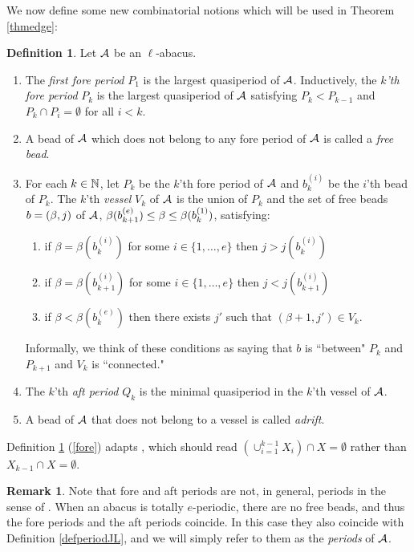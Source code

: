 \documentclass[12pt]{amsart}
\numberwithin{equation}{section}
\theoremstyle{definition}
\newtheorem{definition}[equation]{Definition}
\newtheorem{remark}[equation]{Remark}
\newcommand{\emp}{\emptyset}
\begin{document}
We now define some new combinatorial notions which will be used in Theorem \ref{thmedge}:
\begin{definition}\label{defperiods} Let $\mathcal{A}$ be an $\ell$-abacus.
\begin{enumerate}
 \item\label{fore} The \textit{first fore period} $P_1$ is the largest quasiperiod of $\mathcal{A}$. Inductively, the \textit{$k$'th fore period} $P_k$ is the largest quasiperiod of $\mathcal{A}$ satisfying $P_k<P_{k-1}$ and $P_k\cap P_i=\emp$ for all $i<k$.
\item A bead of $\mathcal{A}$ which does not belong to any fore period of $\mathcal{A}$ is called a \textit{free bead}.
\item\label{vessel} 
For each $k\in\mathbb{N}$, let $P_k$ be the $k$'th fore period of $\mathcal{A}$ and $b_k^{(i)}$ be the $i$'th bead of $P_k$.
The $k$'th \textit{vessel} $V_k$ of $\mathcal{A}$ is the union of $P_k$ and the set of free beads $b=(\beta,j)$ of $\mathcal{A}$, $\beta(b_{k+1}^{(e)})\leq\beta\leq\beta(b_k^{(1)})$, satisfying: 
\begin{enumerate}
 \item if $\beta=\beta(b_k^{(i)})$ for some $i\in\{1,\dots,e\}$ then $j>j(b_k^{(i)})$
 \item if $\beta=\beta(b_{k+1}^{(i)})$ for some $i\in\{1,\dots,e\}$ then $j<j(b_{k+1}^{(i)})$
 \item if $\beta<\beta(b_k^{(e)})$ then there exists $j'$ such that $(\beta+1,j')\in V_k$.
\end{enumerate}
Informally, we think of these conditions as saying that $b$ is ``between" $P_k$ and $P_{k+1}$ and $V_k$ is ``connected."
\item The $k$'th \textit{aft period} $Q_k$ is the minimal quasiperiod in the $k$'th vessel of $\mathcal{A}$. 
\item A bead of $\mathcal{A}$ that does not belong to a vessel is called \textit{adrift}.
\end{enumerate}
\end{definition}
Definition \ref{defperiods} (\ref{fore}) adapts \cite[Definition 5.5]{Gerber2016a}, which should read $(\cup_{i=1}^{k-1}X_i)\cap X=\emp$ rather than $X_{k-1}\cap X=\emp$.

\begin{remark}\label{remforeaft}
Note that fore and aft periods are not, in general, periods in the sense of \cite{JaconLecouvey2012}.
When an abacus is totally $e$-periodic, there are no free beads, and thus the fore periods and the aft periods coincide. 
In this case they also coincide with Definition \ref{defperiodJL}, and
we will simply refer to them as the \textit{periods} of $\mathcal{A}$.
\end{remark}
\end{document}

